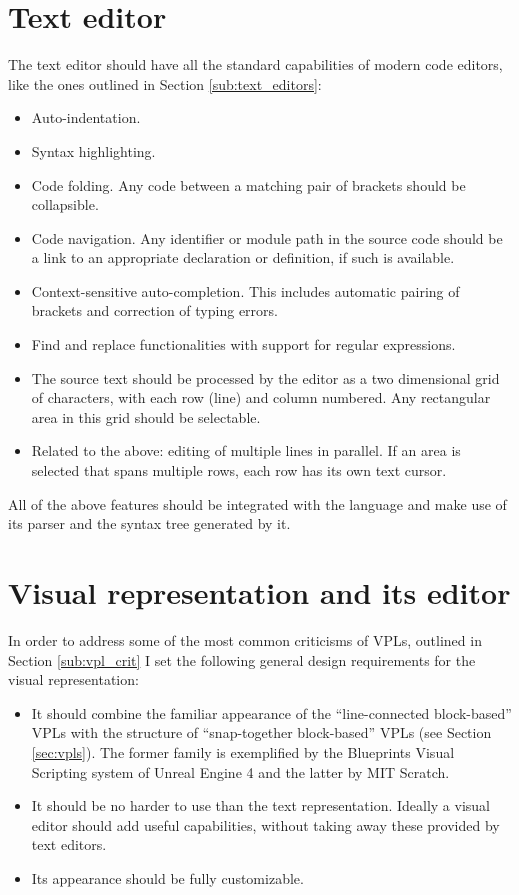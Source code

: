 \section{Text editor}
The text editor should have all the standard capabilities of modern code editors, like the ones outlined in Section \ref{sub:text_editors}:
\begin{itemize}
	\item Auto-indentation.
	\item Syntax highlighting.
	\item Code folding. Any code between a matching pair of brackets should be collapsible.
	\item Code navigation. Any identifier or module path in the source code should be a link to an appropriate declaration or definition, if such is available.
	\item Context-sensitive auto-completion. This includes automatic pairing of brackets and correction of typing errors.
    \item Find and replace functionalities with support for regular expressions.
    \item The source text should be processed by the editor as a two dimensional grid of characters, with each row (line) and column numbered. Any rectangular area in this grid should be selectable.
    \item Related to the above: editing of multiple lines in parallel. If an area is selected that spans multiple rows, each row has its own text cursor.
\end{itemize}

All of the above features should be integrated with the language and make use of its parser and the syntax tree generated by it.

\section{Visual representation and its editor}\label{sec:vis_design}
In order to address some of the most common criticisms of VPLs, outlined in Section \ref{sub:vpl_crit} I set the following general design requirements for the visual representation:
\begin{itemize}
\item It should combine the familiar appearance of the ``line-connected block-based'' VPLs with the structure of ``snap-together block-based'' VPLs (see Section \ref{sec:vpls}). The former family is exemplified by the Blueprints Visual Scripting system of Unreal Engine 4\cite{blueprint} and the latter by MIT Scratch\cite{scratch, scratch_wikipedia}.
\item It should be no harder to use than the text representation. Ideally a visual editor should add useful capabilities, without taking away these provided by text editors.
\item Its appearance should be fully customizable.
\end{itemize}

